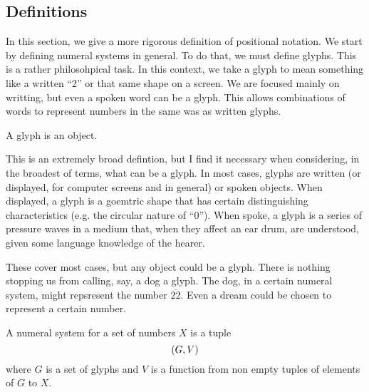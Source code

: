 \documentclass{article}
\begin{document}
	\subsection{Definitions}
	In this section, we give a more rigorous definition of positional notation. We start by defining numeral systems in general. To do that, we must define glyphs. This is a rather philosohpical task. In this context, we take a glyph to mean something like a written ``2'' or that same shape on a screen. We are focused mainly on writting, but even a spoken word can be a glyph. This allows combinations of words to represent numbers in the same was as written glyphs.
	
	\begin{definition}\label{def5}
		A glyph is an object.
	\end{definition}
	\begin{remark}
		This is an extremely broad defintion, but I find it necessary when considering, in the broadest of terms, what can be a glyph. In most cases, glyphs are written (or displayed, for computer screens and in general) or spoken objects. When displayed, a glyph is a goemtric shape that has certain distinguishing characteristics (e.g. the circular nature of ``0''). When spoke, a glyph is a series of pressure waves in a medium that, when they affect an ear drum, are understood, given some language knowledge of the hearer.
		
		These cover most cases, but any object could be a glyph. There is nothing stopping us from calling, say, a dog a glyph. The dog, in a certain numeral system, might repsresent the number $\overline{22}$. Even a dream could be chosen to represent a certain number.
	\end{remark}
	
	\begin{definition}\label{def 6}
		A numeral system for a set of numbers $X$ is a tuple
		$$\pqty{G, V}$$
		where $G$ is a set of glyphs and $V$ is a function from non empty tuples of elements of $G$ to $X$.
	\end{definition}
	
\end{document}

